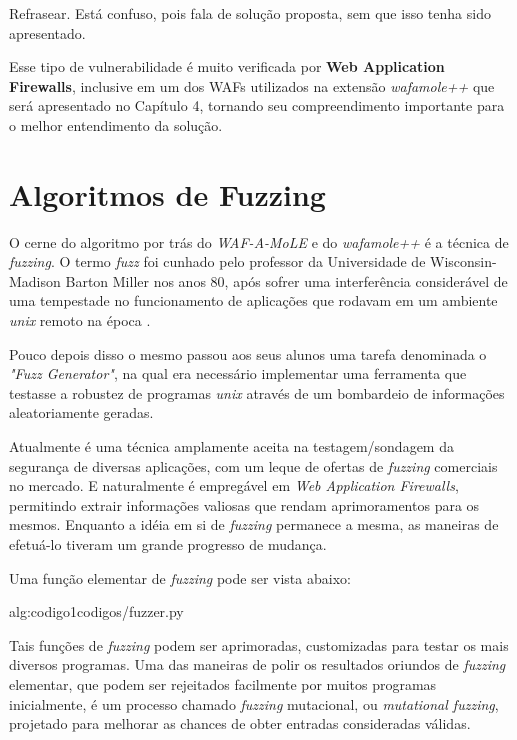 Refrasear. Está confuso, pois fala de solução proposta, sem que isso tenha sido apresentado. 

Esse tipo de vulnerabilidade é muito verificada por \textbf{Web Application Firewalls}, inclusive em um dos WAFs utilizados na extensão \textit{wafamole++} que será apresentado no Capítulo 4, tornando seu compreendimento importante para o melhor entendimento da solução.


\section{Algoritmos de Fuzzing}

O cerne do algoritmo por trás do \textit{WAF-A-MoLE} e do \textit{wafamole++} é a técnica de \textit{fuzzing}. O termo \textit{fuzz} foi cunhado pelo professor da Universidade de Wisconsin-Madison Barton Miller nos anos 80, após sofrer uma interferência considerável de uma tempestade no funcionamento de aplicações que rodavam em um ambiente \textit{unix} remoto na época \cite{fuzzing_info}. 

Pouco depois disso o mesmo passou aos seus alunos uma tarefa denominada o \textit{"Fuzz Generator"}, na qual era necessário implementar uma ferramenta que testasse a robustez de programas \textit{unix} através de um bombardeio de informações aleatoriamente geradas.

Atualmente é uma técnica amplamente aceita na testagem/sondagem da segurança de diversas aplicações, com um leque de ofertas de \textit{fuzzing} comerciais no mercado. E naturalmente é empregável em \textit{Web Application Firewalls}, permitindo extrair informações valiosas que rendam aprimoramentos para os mesmos. Enquanto a idéia em si de \textit{fuzzing} permanece a mesma, as maneiras de efetuá-lo tiveram um grande progresso de mudança.


Uma função elementar de \textit{fuzzing} pode ser vista abaixo:

 {alg:codigo1}{codigos/fuzzer.py}

\bigskip
Tais funções de \textit{fuzzing} podem ser aprimoradas, customizadas para testar os mais diversos programas. Uma das maneiras de polir os resultados oriundos de \textit{fuzzing} elementar, que podem ser rejeitados facilmente por muitos programas inicialmente, é um processo chamado \textit{fuzzing} mutacional, ou \textit{mutational fuzzing}, projetado para melhorar as chances de obter entradas consideradas válidas.

